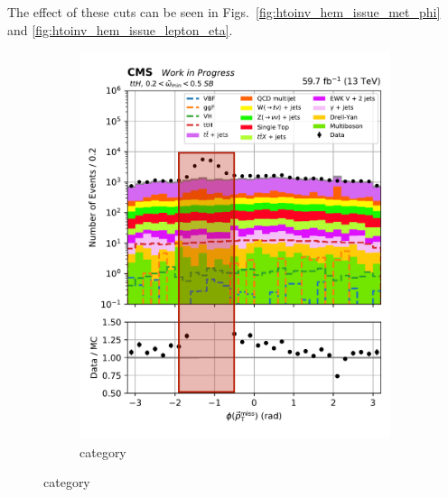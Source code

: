 \medskip

\noindent{}The effect of these cuts can be seen in Figs.~\ref{fig:htoinv_hem_issue_met_phi} and \ref{fig:htoinv_hem_issue_lepton_eta}.

\begin{figure}[htbp]
    \centering
    \begin{subfigure}[b]{0.34\textwidth}
        \includegraphics[width=\textwidth]{figures/hem_issue/sideband_4/met_phi_ttH_before_annotated.pdf}
        \caption{\ttH category}
    \end{subfigure}

\end{figure}
